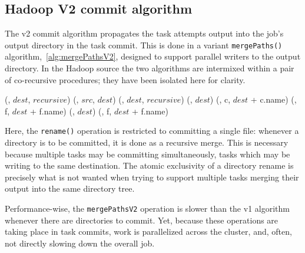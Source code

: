 \documentclass[conference]{IEEEtran}
\begin{document}
\subsection{Hadoop V2 commit algorithm}
\label{subsec:hadoop-v2-commit-algorithm}


The v2 commit algorithm propagates the task attempts output into the job's
output directory in the task commit.
This is done in a variant \texttt{mergePaths()} algorithm,\ \ref{alg:mergePathsV2},
designed to support parallel writers to the output directory.
In the Hadoop source the two algorithms are intermixed within a pair of
co-recursive procedures;
they have been isolated here for clarity.


\begin{procedure*}
\FileOutputCommitVars

   {
     {
      \delete(\fs, $dest$, $recursive$)\;
    }
    \rename(\fs, $src$, $dest$)\;
  } {
     {
       {
        \delete(\fs, $dest$, $recursive$)\;
        \mkdirs(\fs, $dest$)\;
         {
          \mergePathsB(\fs, c, $dest$ + c.name)\;
        }
      } {
         {
          \mergePathsB(\fs, f, $dest$ + f.name)\;
        }
      }
    } {
      \mkdirs(\fs, $dest$)\;
       {
         \mergePathsB(\fs, f, $dest$ + f.name)\;
      }
    }
  }

\caption{mergePathsV2(fs, rc, dest)}
\label{alg:mergePathsV2}

\end{procedure*}

Here, the \texttt{rename()} operation is restricted to committing
a single file: whenever a directory is to be committed, it is done
as a recursive merge.
This is necessary because multiple tasks may be committing simultaneously, tasks which
may be writing to the same destination.
The atomic exclusivity of a directory rename is precisely what is not
wanted when trying to support multiple tasks merging their output into the
same directory tree.

Performance-wise, the \texttt{mergePathsV2} operation is slower
than the v1 algorithm whenever there are directories to commit.
Yet, because these operations are taking place in task commits, work is parallelized
across the cluster, and, often, not directly slowing down the overall job.
\end{document}
